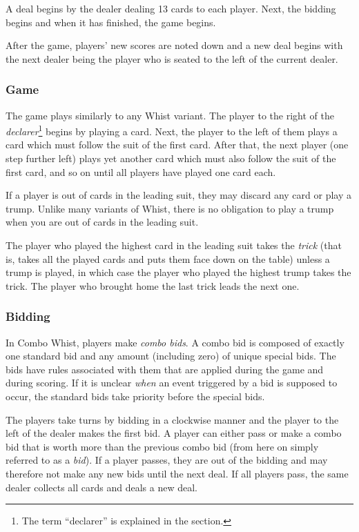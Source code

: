 \documentclass[a4paper]{article}
\begin{document}
			A deal begins by the dealer dealing 13 cards to each player. Next, the bidding begins and when it has finished, the game begins.

			After the game, players' new scores are noted down and a new deal begins with the next dealer being the player who is seated to the left of the current dealer.

			\subsubsection{Game}
				The game plays similarly to any Whist variant. The player to the right of the \emph{declarer}\footnote{The term ``declarer'' is explained in the \textit{} section.} begins by playing a card. Next, the player to the left of them plays a card which must follow the suit of the first card. After that, the next player (one step further left) plays yet another card which must also follow the suit of the first card, and so on until all players have played one card each.

				If a player is out of cards in the leading suit, they may discard any card or play a trump. Unlike many variants of Whist, there is no obligation to play a trump when you are out of cards in the leading suit.

				The player who played the highest card in the leading suit takes the \emph{trick} (that is, takes all the played cards and puts them face down on the table) unless a trump is played, in which case the player who played the highest trump takes the trick. The player who brought home the last trick leads the next one.

			\subsubsection{Bidding}
				\label{sec:bidding}
				In Combo Whist, players make \emph{combo bids}. A combo bid is composed of exactly one standard bid and any amount (including zero) of unique special bids. The bids have rules associated with them that are applied during the game and during scoring. If it is unclear \emph{when} an event triggered by a bid is supposed to occur, the standard bids take priority before the special bids.

				The players take turns by bidding in a clockwise manner and the player to the left of the dealer makes the first bid. A player can either pass or make a combo bid that is worth more than the previous combo bid (from here on simply referred to as a \emph{bid}). If a player passes, they are out of the bidding and may therefore not make any new bids until the next deal. If all players pass, the same dealer collects all cards and deals a new deal.
\end{document}
